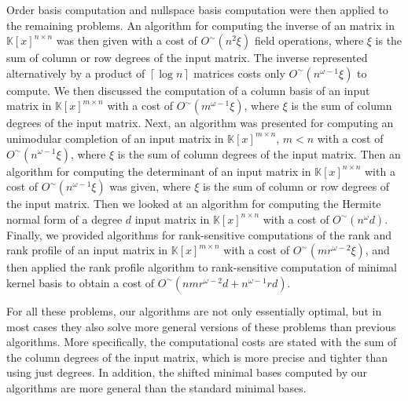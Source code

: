 Order basis computation and nullspace basis computation were then
applied to the remaining problems. An algorithm for computing the
inverse of an matrix in $\mathbb{K}\left[x\right]^{n\times n}$ was
then given with a cost of $O^{\sim}\left(n^{2}\xi\right)$ field operations,
where $\xi$ is the sum of column or row degrees of the input matrix.
The inverse represented alternatively by a product of $\left\lceil \log n\right\rceil $
matrices costs only $O^{\sim}\left(n^{\omega-1}\xi\right)$ to compute.
We then discussed the computation of a column basis of an input matrix
in $\mathbb{K}\left[x\right]^{m\times n}$ with a cost of $O^{\sim}\left(m^{\omega-1}\xi\right)$,
where $\xi$ is the sum of column degrees of the input matrix. Next,
an algorithm was presented for computing an unimodular completion
of an input matrix in $\mathbb{K}\left[x\right]^{m\times n}$, $m<n$
with a cost of $O^{\sim}\left(n^{\omega-1}\xi\right)$, where $\xi$
is the sum of column degrees of the input matrix. Then an algorithm
for computing the determinant of an input matrix in $\mathbb{K}\left[x\right]^{n\times n}$
with a cost of $O^{\sim}\left(n^{\omega-1}\xi\right)$ was given,
where $\xi$ is the sum of column or row degrees of the input matrix.
Then we looked at an algorithm for computing the Hermite normal form
of a degree $d$ input matrix in $\mathbb{K}\left[x\right]^{n\times n}$
with a cost of $O^{\sim}\left(n^{\omega}d\right)$. Finally, we provided
algorithms for rank-sensitive computations of the rank and rank profile
of an input matrix in $\mathbb{K}\left[x\right]^{m\times n}$ with
a cost of $O^{\sim}\left(mr^{\omega-2}\xi\right)$, and then applied
the rank profile algorithm to rank-sensitive computation of minimal
kernel basis to obtain a cost of $O^{\sim}(nmr^{\omega-2}d+n^{\omega-1}rd)$.

For all these problems, our algorithms are not only essentially optimal,
but in most cases they also solve more general versions of these problems
than previous algorithms. More specifically, the computational costs
are stated with the  sum of the column degrees of the input matrix,
which is more precise and tighter than using just degrees. In addition,
the shifted minimal bases computed by our algorithms are more general
than the standard minimal bases.

